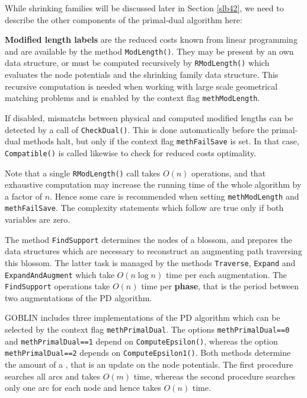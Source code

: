 \documentclass[a4paper,11pt,twoside]{book}
\begin{document}
\begin{multicols}{2}
While shrinking families will be discussed later in Section \ref{slb42}, we
need to describe the other components of the primal-dual algorithm here:

{\bf Modified length labels} are the reduced
costs known from linear programming and are available by the method
\verb/ModLength()/. They may be present by an own data structure, or must be
computed recursively by \verb/RModLength()/
which evaluates the node potentials and the shrinking family data structure.
This recursive computation is needed when working with large scale geometrical
matching problems and is enabled by the context flag \verb/methModLength/.

If disabled, mismatchs between physical and computed modified lengths can be
detected by a call of \verb/CheckDual()/. This is done automatically before
the primal-dual methods halt, but only if the context flag \verb/methFailSave/
is set. In that case, \verb/Compatible()/ is called likewise to check for
reduced costs optimality.

Note that a single \verb/RModLength()/ call takes $O(n)$ operations, and that
exhaustive computation may increase the running time of the whole algorithm by
a factor of $n$. Hence some care is recommended when setting
\verb/methModLength/ and \verb/methFailSave/. The complexity statements which
follow are true only if both variables are zero.

The method \verb/FindSupport/ determines the nodes of a blossom, and prepares
the data structures which are necessary to reconstruct an augmenting path
traversing this blossom. The latter task is managed by the methods
\verb/Traverse/, \verb/Expand/ and \verb/ExpandAndAugment/ which take
$O(n\log{n})$ time per each augmentation. The \verb/FindSupport/ operations
take $O(n)$ time per {\bf phase}, that is the
period between two augmentations of the PD algorithm.

GOBLIN includes three implementations of the PD algorithm which can be selected
by the context flag \verb/methPrimalDual/. The options \verb/methPrimalDual==0/
and \verb/methPrimalDual==1/ depend on \verb/ComputeEpsilon()/, whereas
the option \verb/methPrimalDual==2/ depends on \verb/ComputeEpsilon1()/.
Both methods determine the amount of a , that is an update on
the node potentials. The first procedure searches all arcs and takes $O(m)$
time, whereas the second procedure searches only one arc for each node and
hence takes $O(n)$ time.


\end{multicols}
\end{document}
